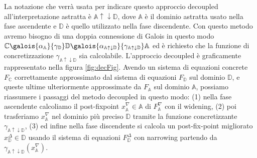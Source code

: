 La notazione che verrà usata per indicare questo approccio decoupled all'interpretazione astratta è \(\mathbb{A}\uparrow\downarrow\mathbb{D}\), dove \(\mathbb{A}\) è il dominio astratta usato nella fase ascendente e \(\mathbb{D}\) è quello utilizzato nella fase discendente. Con questo metodo avremo bisogno di una doppia connessione di Galois in questo modo \(\mathbb{C}\galois{\alpha_{\mathbb{A}}}{\gamma_{\mathbb{D}}}\mathbb{D}\galois{\alpha_{\mathbb{A}\uparrow\downarrow\mathbb{D}}}{\gamma_{\mathbb{A}\uparrow\downarrow\mathbb{D}}}\mathbb{A}\) ed è richiesto che la funzione di concretizzazione \(\gamma_{\mathbb{A}\uparrow\downarrow\mathbb{D}}\) sia calcolabile. L'approccio decoupled è graficamente rappresentato nella figura \ref{fig:decFig}. Avendo un sistema di equazioni concrete \(F_{\mathbb{C}}\) correttamente approssimato dal sistema di equazioni \(F_{\mathbb{D}}\) sul dominio \(\mathbb{D}\), e queste ultime ulteriormente approssimate da \(F_{\mathbb{A}}\) sul dominio \(\mathbb{A}\), possiamo riassumere i passaggi del metodo decoupled in questo modo: (1) nella fase ascendente calcoliamo il post-fixpoint \(x^{\nabla}_{\mathbb{A}}\in\mathbb{A}\) di \(F^{\nabla}_{\mathbb{A}}\) con il widening, (2) poi trasferiamo \(x^{\nabla}_{\mathbb{A}}\) nel dominio più preciso \(\mathbb{D}\) tramite la funzione concretizzante \(\gamma_{\mathbb{A}\uparrow\downarrow\mathbb{D}}\), (3) ed infine nella fase discendente si calcola un post-fix-point migliorato \(x^{\Delta}_{\mathbb{D}}\in\mathbb{D}\) usando il sistema di equazioni \(F^{\Delta}_{\mathbb{D}}\) con narrowing partendo da  \(\gamma_{\mathbb{A}\uparrow\downarrow\mathbb{D}}(x^{\nabla}_{\mathbb{A}})\).

